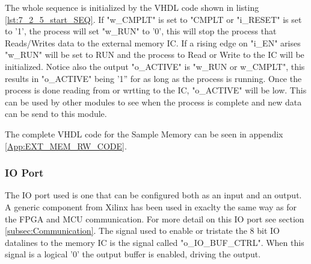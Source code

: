 The whole sequence is initialized by the VHDL code shown in listing \ref{lst:7_2_5_start_SEQ}. If "w\_CMPLT" is set to "CMPLT or "i\_RESET" is set to '1', the process will set "w\_RUN" to '0', this will stop the process that Reads/Writes data to the external memory IC. If a rising edge on "i\_EN" arises "w\_RUN" will be set to RUN and the process to Read or Write to the IC will be initialized. Notice also the output "o\_ACTIVE" is "w\_RUN or w\_CMPLT", this results in "o\_ACTIVE" being '1'' for as long as the process is running. Once the process is done reading from or wrtting to the IC, "o\_ACTIVE" will be low. This can be used by other modules to see when the process is complete and new data can be send to this module.

 

The complete VHDL code for the Sample Memory can be seen in appendix \ref{App:EXT_MEM_RW_CODE}.

\subsubsection{IO Port}
The IO port used is one that can be configured both as an input and an output. A generic component from Xilinx has been used in exaclty the same way as for the FPGA and MCU communication. For more detail on this IO port see section \ref{subsec:Communication}. The signal used to enable or tristate the 8 bit IO datalines to the memory IC is the signal called "o\_IO\_BUF\_CTRL". When this signal is a logical '0' the output buffer is enabled, driving the output.